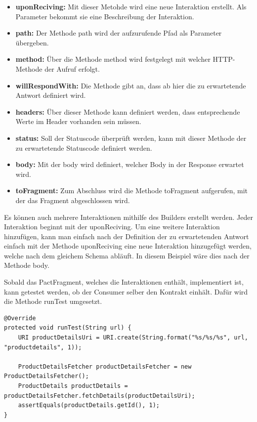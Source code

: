 \documentclass{llncs}
\begin{document}
\begin{itemize}
\item \textbf{uponReciving: } Mit dieser Metohde wird eine neue Interaktion erstellt. Als Parameter bekommt sie eine Beschreibung der Interaktion.
\item \textbf{path: } Der Methode path wird der aufzurufende Pfad als Parameter übergeben.
\item \textbf{method: } Über die Methode method wird festgelegt mit welcher HTTP-Methode der Aufruf erfolgt.
\item \textbf{willRespondWith: } Die Methode gibt an, dass ab hier die zu erwartetende Antwort definiert wird.
\item \textbf{headers: } Über dieser Methode kann definiert werden, dass entsprechende Werte im Header vorhanden sein müssen.
\item \textbf{status: } Soll der Statuscode überprüft werden, kann mit dieser Methode der zu erwartetende Statuscode definiert werden.
\item \textbf{body: } Mit der body wird definiert, welcher Body in der Response erwartet wird.
\item \textbf{toFragment: } Zum Abschluss wird die Methode toFragment aufgerufen, mit der das Fragment abgeschlossen wird.
\end{itemize}

Es können auch mehrere Interaktionen mithilfe des Builders erstellt werden. Jeder Interaktion beginnt mit der uponReciving. Um eine weitere Interaktion hinzufügen, kann man einfach nach der Definition der zu erwartetenden Antwort einfach mit der Methode uponReciving eine neue Interaktion hinzugefügt werden, welche nach dem gleichem Schema abläuft. In diesem Beispiel wäre dies nach der Methode body.

Sobald das PactFragment, welches die Interaktionen enthält, implementiert ist, kann getestet werden, ob der Consumer selber den Kontrakt einhält. Dafür wird die Methode runTest umgesetzt.

\lstset{language = Java}
\begin{lstlisting}
@Override
protected void runTest(String url) {
    URI productDetailsUri = URI.create(String.format("%s/%s/%s", url, "productdetails", 1));

    ProductDetailsFetcher productDetailsFetcher = new ProductDetailsFetcher();
    ProductDetails productDetails =  productDetailsFetcher.fetchDetails(productDetailsUri);
    assertEquals(productDetails.getId(), 1);
}
\end{lstlisting}
\end{document}
